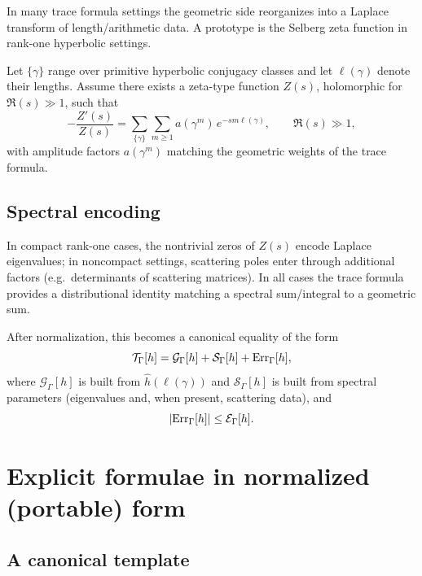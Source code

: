In many trace formula settings the geometric side reorganizes into a Laplace transform of length/arithmetic data.
A prototype is the Selberg zeta function in rank-one hyperbolic settings.

Let $\{\gamma\}$ range over primitive hyperbolic conjugacy classes and let $\ell(\gamma)$ denote their lengths.
Assume there exists a zeta-type function $Z(s)$, holomorphic for $\Re(s)\gg1$, such that
\begin{equation}\label{eq:10.logder}
-\frac{Z'(s)}{Z(s)}
=
\sum_{\{\gamma\}}\sum_{m\ge1} a(\gamma^m)\,e^{-sm\ell(\gamma)},
\qquad \Re(s)\gg1,
\end{equation}
with amplitude factors $a(\gamma^m)$ matching the geometric weights of the trace formula.

\subsection{Spectral encoding}
\label{subsec:10.spectral-interp}

In compact rank-one cases, the nontrivial zeros of $Z(s)$ encode Laplace eigenvalues; in noncompact settings, scattering poles
enter through additional factors (e.g.\ determinants of scattering matrices).
In all cases the trace formula provides a distributional identity matching a spectral sum/integral to a geometric sum.

After normalization, this becomes a canonical equality of the form
\begin{equation}\label{eq:10.explicit.schematic}
\mathcal T_\Gamma[h]=\mathcal G_\Gamma[h]+\mathcal S_\Gamma[h]+\mathrm{Err}_\Gamma[h],
\end{equation}
where $\mathcal G_\Gamma[h]$ is built from $\widehat h(\ell(\gamma))$ and $\mathcal S_\Gamma[h]$ is built from spectral parameters
(eigenvalues and, when present, scattering data), and
\[
|\mathrm{Err}_\Gamma[h]|\le \mathcal E_\Gamma[h].
\]

\section{Explicit formulae in normalized (portable) form}
\label{sec:10.explicit}

\subsection{A canonical template}
\label{subsec:10.explicit.template}

